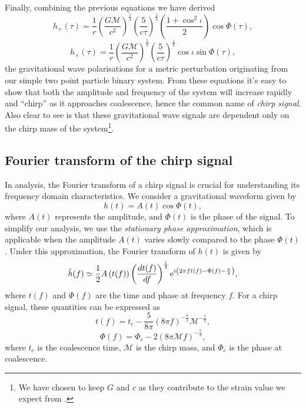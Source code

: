 Finally, combining the previous equations we have derived
%
\begin{equation}
    h_{+}(\tau) = \frac{1}{r}\left(\frac{G\mathcal{M}}{c^{2}}\right)^{\frac{5}{4}}\left(\frac{5}{c\tau}\right)^{\frac{1}{4}}\left(\frac{1+\cos^{2}\iota}{2}\right)\cos\Phi(\tau),
\end{equation}
%
\begin{equation}
    h_{\times}(\tau) = \frac{1}{r}\left(\frac{G\mathcal{M}}{c^{2}}\right)^{\frac{5}{4}}\left(\frac{5}{c\tau}\right)^{\frac{1}{4}}\cos\iota\sin\Phi(\tau),
\end{equation}
%
the gravitational wave polarisations for a metric perturbation originating from our simple two point particle binary system. From these equations it's easy to show that both the amplitude and frequency of the system will increase rapidly and ``chirp'' as it approaches coalescence, hence the common name of \textit{chirp signal}. Also clear to see is that these gravitational wave signals are dependent only on the chirp mass of the system\footnote{We have chosen to keep $G$ and $c$ as they contribute to the strain value we expect from \gws.}.

\subsection{\label{1:sec:fourier_transform_chirp}Fourier transform of the chirp signal}

In \gwadj analysis, the Fourier transform of a chirp signal is crucial for understanding its frequency domain characteristics. We consider a gravitational waveform given by
%
\begin{equation}
    h(t) = A(t) \cos \Phi(t),
\end{equation}
%
where \( A(t) \) represents the amplitude, and \( \Phi(t) \) is the phase of the signal. To simplify our analysis, we use the \textit{stationary phase approximation}, which is applicable when the amplitude \( A(t) \) varies slowly compared to the phase \( \Phi(t) \). Under this approximation, the Fourier transform of \( h(t) \) is given by
%
\begin{equation}
    \Tilde{h}(f) \simeq \frac{1}{2} A\left(t(f)\right) \left(\frac{dt(f)}{df}\right)^{\frac{1}{2}} {\rm e}^{i \left(2\pi f t(f) - \Phi(f) - \frac{\pi}{4}\right)},
\end{equation}
%
where \( t(f) \) and \( \Phi(f) \) are the time and phase at frequency \( f \). For a chirp signal, these quantities can be expressed as
%
\begin{equation}
    t(f) = t_c - \frac{5}{8\pi}\left(8\pi f\right)^{-\frac{8}{3}} \mathcal{M}^{-\frac{5}{3}},
\end{equation}
%
\begin{equation}
    \Phi(f) = \Phi_c - 2\left(8\pi \mathcal{M} f\right)^{-\frac{5}{3}},
\end{equation}
%
where \( t_c \) is the coalescence time, \( \mathcal{M} \) is the chirp mass, and \( \Phi_c \) is the phase at coalescence.

